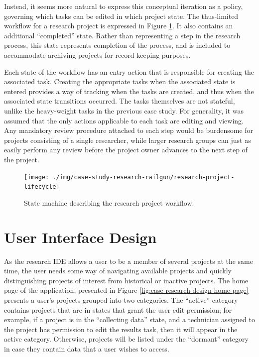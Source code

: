 \documentclass[document.tex]{subfiles}
\begin{document}
Instead, it seems more natural to express this conceptual iteration as a policy, governing which tasks can be edited in which project state. The thus-limited workflow for a research project is expressed in Figure \ref{fig:case-research-design-project-workflow}. It also contains an additional ``completed'' state. Rather than representing a step in the research process, this state represents completion of the process, and is included to accommodate archiving projects for record-keeping purposes.

Each state of the workflow has an entry action that is responsible for creating the associated task. Creating the appropriate tasks when the associated state is entered provides a way of tracking when the tasks are created, and thus when the associated state transitions occurred. The tasks themselves are not stateful, unlike the heavy-weight tasks in the previous case study. For generality, it was assumed that the only actions applicable to each task are editing and viewing. Any mandatory review procedure attached to each step would be burdensome for projects consisting of a single researcher, while larger research groups can just as easily perform any review before the project owner advances to the next step of the project.

\begin{figure}[!ht]
\centering \texttt{[image: ./img/case-study-research-railgun/research-project-lifecycle]}
\caption{State machine describing the research project workflow.}
\label{fig:case-research-design-project-workflow}
\end{figure}

\FloatBarrier

\section {User Interface Design}
\label {sec:case-research-ui-design}


As the research IDE allows a user to be a member of several projects at the same time, the user needs some way of navigating available projects and quickly distinguishing projects of interest from historical or inactive projects. The home page of the application, presented in Figure \ref{fig:case-research-design-home-page} presents a user's projects grouped into two categories. The ``active'' category contains projects that are in states that grant the user edit permission; for example, if a project is in the ``collecting data'' state, and a technician assigned to the project has permission to edit the results task, then it will appear in the active category. Otherwise, projects will be listed under the ``dormant'' category in case they contain data that a user wishes to access.
\end{document}
